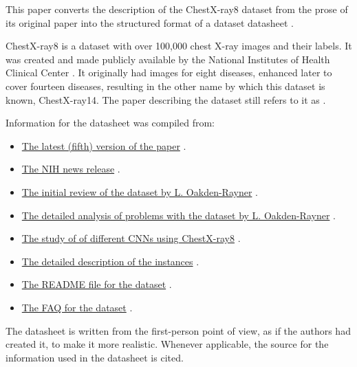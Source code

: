 

This paper converts the description of the ChestX-ray8 dataset \cite{Wang2017} from the prose of its original paper into the structured format of a dataset datasheet \cite{Gebru2018}. 

ChestX-ray8 is a dataset with over 100,000 chest X-ray images and their labels. It was created and made publicly available by the National Institutes of Health Clinical Center \cite{Health2017}. It originally had images for eight diseases, enhanced later to cover fourteen diseases, resulting in the other name by which this dataset is known, ChestX-ray14. The paper describing the dataset still refers to it as .

Information for the datasheet was compiled from:

\begin{itemize}
    \item \href{https://arxiv.org/abs/1705.02315v5}{The latest (fifth) version of the paper} \cite{Wang2017}.
    \item \href{https://www.nih.gov/news-events/news-releases/nih-clinical-center-provides-one-largest-publicly-available-chest-X-ray-datasets-scientific-community}{The NIH news release} \cite{Health2017}.
    \item \href{https://lukeoakdenrayner.wordpress.com/2017/11/18/quick-thoughts-on-chestxray14-performance-claims-and-clinical-tasks/}{The initial review of the dataset by L. Oakden-Rayner} \cite{OakdenRayner2017}.
    \item \href{https://lukeoakdenrayner.wordpress.com/2017/12/18/the-chestxray14-dataset-problems/}{The detailed analysis of problems with the dataset by L. Oakden-Rayner} \cite{OakdenRayner2018}.
    \item \href{https://www.nature.com/articles/s41598-019-42294-8}{The study of of different CNNs using ChestX-ray8} \cite{Baltruschat2019}.
    \item \href{https://nihcc.app.box.com/v/ChestXray-NIHCC/file/219760887468}{The detailed description of the instances} \cite{HealthClinicalCenter2017}.
    \item \href{https://nihcc.app.box.com/v/ChestXray-NIHCC/file/220660789610}{The README file for the dataset} \cite{HealthClinicalCenter2017}.
    \item \href{https://nihcc.app.box.com/v/ChestXray-NIHCC/file/249502714403}{The FAQ for the dataset} \cite{HealthClinicalCenter2017}.
\end{itemize}

The datasheet is written from the first-person point of view, as if the authors had created it, to make it more realistic. Whenever applicable, the source for the information used in the datasheet is cited.


